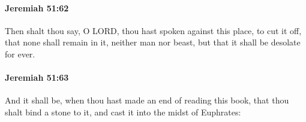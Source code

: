 		\paragraph{Jeremiah 51:62} %
			\label{JEREMIAH-51-62}

			Then shalt thou say, O LORD, thou hast spoken against this place, to cut it off, that none shall remain in it, neither man nor beast, but that it shall be desolate for ever.


		\paragraph{Jeremiah 51:63} %
			\label{JEREMIAH-51-63}

			And it shall be, when thou hast made an end of reading this book, that thou shalt bind a stone to it, and cast it into the midst of Euphrates:


